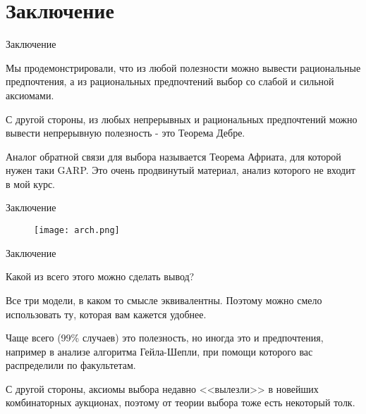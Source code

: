 \documentclass{beamer}
\begin{document}
\section{Заключение}

\begin{frame}{Заключение}

Мы продемонстрировали, что из любой полезности можно вывести рациональные предпочтения, а из рациональных предпочтений выбор со слабой и сильной  аксиомами.

С другой стороны, из любых непрерывных и рациональных предпочтений можно вывести непрерывную полезность - это Теорема Дебре.

Аналог обратной связи для выбора называется \alert{Теорема Африата}, для которой нужен таки GARP. Это очень продвинутый материал, анализ которого не входит в мой курс. 

\end{frame}

\begin{frame}{Заключение}

\begin{figure}[hbt]
\centering
\texttt{[image: arch.png]}
\end{figure}

\end{frame}

\begin{frame}{Заключение}

Какой из всего этого можно сделать вывод?

Все три модели, в каком то смысле эквивалентны. Поэтому можно смело использовать ту, которая вам кажется удобнее. 

Чаще всего (99\% случаев) это полезность, но иногда это и предпочтения, например в анализе алгоритма Гейла-Шепли, при помощи которого вас распределили по факультетам. 

С другой стороны, аксиомы выбора недавно <<вылезли>> в новейших комбинаторных аукционах, поэтому от теории выбора тоже есть некоторый толк.

\end{frame}
\end{document}
